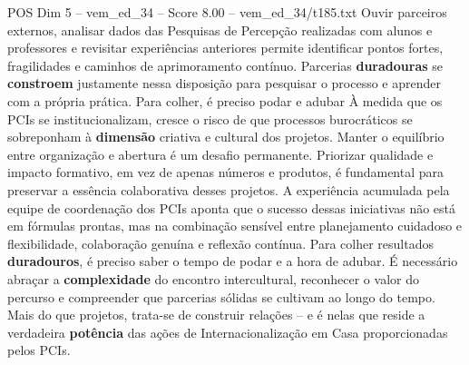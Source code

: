 \begin{textsample}{POS Dim 5 – vem\_ed\_34 – Score 8.00 – vem\_ed\_34/t185.txt}
Ouvir parceiros externos, analisar dados das Pesquisas de Percepção realizadas com alunos e professores e revisitar experiências anteriores permite identificar pontos fortes, fragilidades e caminhos de aprimoramento contínuo.
Parcerias \textbf{duradouras} se \textbf{constroem} justamente nessa disposição para pesquisar o processo e aprender com a própria prática.
Para colher, é preciso podar e adubar À medida que os PCIs se institucionalizam, cresce o risco de que processos burocráticos se sobreponham à \textbf{dimensão} criativa e cultural dos projetos.
Manter o equilíbrio entre organização e abertura é um desafio permanente.
Priorizar qualidade e impacto formativo, em vez de apenas números e produtos, é fundamental para preservar a essência colaborativa desses projetos.
A experiência acumulada pela equipe de coordenação dos PCIs aponta que o sucesso dessas iniciativas não está em fórmulas prontas, mas na combinação sensível entre planejamento cuidadoso e flexibilidade, colaboração genuína e reflexão contínua.
Para colher resultados \textbf{duradouros}, é preciso saber o tempo de podar e a hora de adubar.
É necessário abraçar a \textbf{complexidade} do encontro intercultural, reconhecer o valor do percurso e compreender que parcerias sólidas se cultivam ao longo do tempo.
Mais do que projetos, trata-se de construir relações – e é nelas que reside a verdadeira \textbf{potência} das ações de Internacionalização em Casa proporcionadas pelos PCIs.

\end{textsample}
